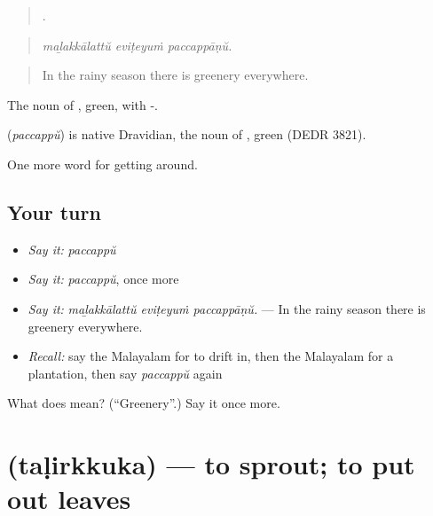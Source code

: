 \begin{quote}
  .
\end{quote}

\begin{quote}
\emph{maḻakkālattŭ eviṭeyuṁ paccappāṇŭ.}
\end{quote}

\begin{quote}
In the rainy season there is greenery everywhere.
\end{quote}

The noun of , green, with -.

\begin{cousinweb}
\textbf{} (\emph{paccappŭ}) is native Dravidian, the noun of , green (DEDR 3821).
\end{cousinweb}

\begin{grammarlens}[title={What you've built}]
One more word for getting around.
\end{grammarlens}

\subsection*{Your turn}
\begin{itemize}
\raggedright
  \item \emph{Say it:} \emph{paccappŭ}
  \item \emph{Say it:} \emph{paccappŭ}, once more
  \item \emph{Say it:} \emph{maḻakkālattŭ eviṭeyuṁ paccappāṇŭ.} — In the rainy season there is greenery everywhere.
  \item \emph{Recall:} say the Malayalam for to drift in, then the Malayalam for a plantation, then say \emph{paccappŭ} again
\end{itemize}

\begin{tcolorbox}[breakable,colback=teal!4,colframe=teal!35!black,title={Before you move on}]
What does  mean? (\textquotedblleft{}Greenery\textquotedblright{}.) Say it once more.
\end{tcolorbox}
\section[\texorpdfstring{\ml{തളിർക്കുക} (taḷirkkuka)}{തളിർക്കുക (taḷirkkuka)}]{ (taḷirkkuka) — to sprout; to put out leaves}

